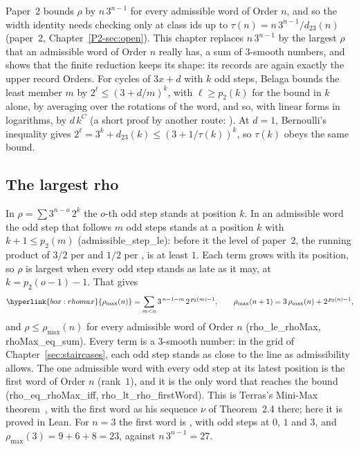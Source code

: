 \documentclass[10pt,a4paper,titlepage]{article}
\makeatletter
\newcommand{\termhere}[1]{\leavevmode
  \Hy@raisedlink{\hyper@anchorstart{term:#1}\hyper@anchorend}}
\newcommand{\keysym}[2]{\hyperlink{box:#1}{#2}}
\newcommand{\lean}[1]{\textsf{#1}}
\makeatother
\begin{document}
Paper~2 bounds $\rho$ by $n\,3^{n-1}$ for every admissible word of Order $n$, and so the
width identity needs checking only at class ids up to $\tau(n) = n\,3^{n-1}/d_{23}(n)$
(paper~2, Chapter~\ref{P2-sec:open}). This chapter replaces $n\,3^{n-1}$ by the largest
$\rho$ that an admissible word of Order $n$ really has, a sum of $3$-smooth numbers, and
shows that the finite reduction keeps its shape: its records are again exactly the upper
record Orders. For cycles of $3x+d$ with $k$ odd steps, Belaga bounds the least member $m$ by
$2^{\ell} \le (3 + d/m)^k$, with $\ell \ge p_2(k)$ for the bound in $k$ alone, by averaging over the
rotations of the word, and so, with linear forms in logarithms, by $d\,k^{C}$ \cite{Belaga2003}
(a short proof by another route: \cite{Kaneda2010}). At $d = 1$, Bernoulli's inequality gives
$2^{\ell} = 3^k + d_{23}(k) \le (3 + 1/\tau(k))^k$, so $\tau(k)$ obeys the same bound.

\subsection*{The largest rho}

\termhere{rhomax}In $\rho = \sum 3^{n-o}\,2^{k}$ the $o$-th odd step stands at position $k$. In an
admissible word the odd step that follows $m$ odd steps stands at a position $k$ with
$k + 1 \le p_2(m)$ (\lean{admissible\_step\_le}): before it the level of paper~2, the running product of $3/2$ per  and $1/2$ per , is at least $1$.
Each term grows with its position, so $\rho$ is largest when every odd step stands as late
as it may, at $k = p_2(o - 1) - 1$. That gives
\[
\keysym{rhomax}{\rho_{\max}(n)} = \sum_{m < n} 3^{\,n-1-m}\,2^{\,p_2(m)-1},
\qquad \rho_{\max}(n + 1) = 3\,\rho_{\max}(n) + 2^{\,p_2(n)-1},
\]
and $\rho \le \rho_{\max}(n)$ for every admissible word of Order $n$
(\lean{rho\_le\_rhoMax}, \lean{rhoMax\_eq\_sum}). Every term is a $3$-smooth number: in the
grid of Chapter~\ref{sec:staircases}, each odd step stands as close to the line as
admissibility allows. The one admissible word with every odd step at its latest position is the first word
of Order $n$ (rank~$1$), and it is the only word that reaches the bound
(\lean{rho\_eq\_rhoMax\_iff}, \lean{rho\_lt\_rho\_firstWord}). This is Terras's Mini-Max
theorem~\cite[Thm.~2.6]{Terras1976}, with the first word as his sequence $\nu$ of
Theorem~2.4 there; here it is proved in Lean. For $n = 3$ the first word is
, with odd steps at $0$, $1$ and $3$, and $\rho_{\max}(3) = 9 + 6 + 8 = 23$,
against $n\,3^{n-1} = 27$.
\end{document}
